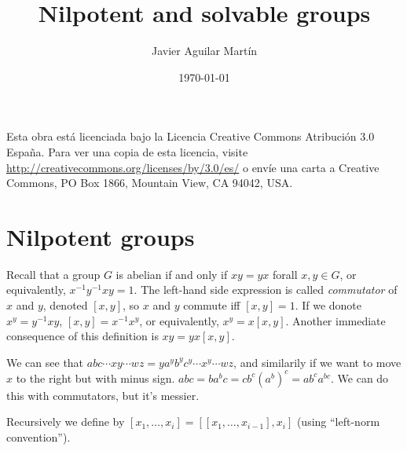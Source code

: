 \documentclass[twoside, 11pt]{article}
\begin{document}

\author{Javier Aguilar Martín }
\date{\today}
\title{Nilpotent and solvable groups}

\maketitle


\begin{abstract}

\end{abstract}


	\vfill
	Esta obra está licenciada bajo la Licencia Creative Commons Atribución 3.0 España. Para ver una copia de esta licencia, visite \url{http://creativecommons.org/licenses/by/3.0/es/} o envíe una carta a Creative Commons, PO Box 1866, Mountain View, CA 94042, USA.


\newpage
\tableofcontents

\newpage


\section{Nilpotent groups}
Recall that a group $G$ is abelian if and only if $xy=yx$ forall $x,y\in G$, or equivalently, $x^{-1}y^{-1}xy=1$. The left-hand side expression is called \emph{commutator} of $x$ and $y$, denoted $[x,y]$, so $x$ and $y$ commute iff $[x,y]=1$. If we donote $x^y=y^{-1}xy$, $[x,y]=x^{-1}x^y$, or equivalently, $x^y=x[x,y]$. Another immediate consequence of this definition is $xy=yx[x,y]$.

We can see that $abc\cdots xy\cdots wz=y a^yb^y c^y\cdots x^y\cdots wz$, and similarily if we want to move $x$ to the right but with minus sign. $abc=ba^bc=cb^c(a^b)^c=ab^ca^{bc}$. We can do this with commutators, but it's messier.

Recursively we define by $[x_1,\dots, x_i]=[[x_1,\dots, x_{i-1}],x_i]$ (using ``left-norm convention''). 
\end{document}
